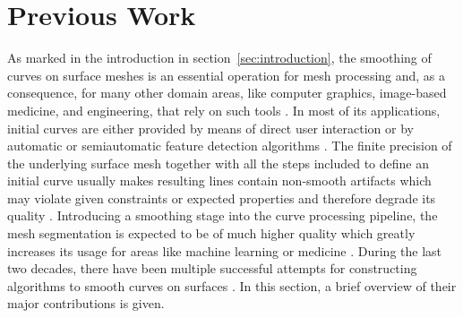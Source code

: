 \documentclass{stdlocal}
\begin{document}
\section{Previous Work} %
\label{sec:previous_work}

As marked in the introduction in section~\ref{sec:introduction}, the smoothing of curves on surface meshes is an essential operation for mesh processing and, as a consequence, for many other domain areas, like computer graphics, image-based medicine, and engineering, that rely on such tools \autocite{ji2006,kaplansky2009}.
In most of its applications, initial curves are either provided by means of direct user interaction or by automatic or semiautomatic feature detection algorithms \autocite{zachow2003,lawonn2014}.
The finite precision of the underlying surface mesh together with all the steps included to define an initial curve usually makes resulting lines contain non-smooth artifacts which may violate given constraints or expected properties and therefore degrade its quality \autocite{kaplansky2009,lawonn2014}.
Introducing a smoothing stage into the curve processing pipeline, the mesh segmentation is expected to be of much higher quality which greatly increases its usage for areas like machine learning \autocite{benhabiles2011} or medicine \autocite{zachow2003,alirr2019}.
During the last two decades, there have been multiple successful attempts for constructing algorithms to smooth curves on surfaces \autocite{hofer2004,bischoff2005,lawonn2014,mancinelli2022}.
In this section, a brief overview of their major contributions is given.
\end{document}
